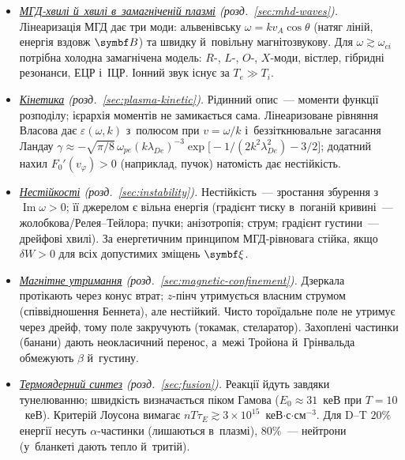 \documentclass[biblatex]{ConspectBook}
\begin{document}
\begin{itemize}
	  ізотропним тиском). Магнітне поле вморожене в~плазму за $R_m\gg1$, але самої вмороженості для утримання недостатньо.
	  Параметр $\beta=8\pi p/B^2$ показує, наскільки плазма деформує поле. Діамагнітний струм однаковий у~частинковому,
	  рідинному описах і~через намагніченість $M=-p/B$.
	\item \emph{\hyperref[sec:mhd-waves]{МГД-хвилі й~хвилі в~замагніченій плазмі} (розд.~\ref{sec:mhd-waves}).} Лінеаризація МГД дає три моди: альвенівську
	  $\omega=kv_A\cos\theta$ (натяг ліній, енергія вздовж $\vect B$) та швидку й~повільну магнітозвукову. Для $\omega\gtrsim\omega_{ci}$
	  потрібна холодна замагнічена модель: $R$-, $L$-, $O$-, $X$-моди, вістлер, гібридні резонанси, ЕЦР і~ІЦР. Іонний звук
	  існує за $T_e\gg T_i$.
	\item \emph{\hyperref[sec:plasma-kinetic]{Кінетика} (розд.~\ref{sec:plasma-kinetic}).} Рідинний опис~--- моменти функції розподілу; ієрархія моментів не замикається сама. Лінеаризоване
	  рівняння Власова дає $\varepsilon(\omega,k)$ з~полюсом при $v=\omega/k$ і~беззіткнювальне загасання Ландау
	  $\gamma\approx-\sqrt{\pi/8}\,\omega_{pe}(k\lambda_{De})^{-3}\exp\bigl[-1/(2k^2\lambda_{De}^2)-3/2\bigr]$; додатний нахил
	  $F_0'(v_\varphi)>0$ (наприклад, пучок) натомість дає нестійкість.
	\item \emph{\hyperref[sec:instability]{Нестійкості} (розд.~\ref{sec:instability}).} Нестійкість~--- зростання збурення з~$\operatorname{Im}\omega>0$; її джерелом є вільна енергія
	  (градієнт тиску в~поганій кривині~--- жолобкова/Релея--Тейлора; пучки; анізотропія; струм; градієнт густини~--- дрейфові хвилі).
	  За енергетичним принципом МГД-рівновага стійка, якщо $\delta W>0$ для всіх допустимих зміщень $\vect\xi$.
	\item \emph{\hyperref[sec:magnetic-confinement]{Магнітне утримання} (розд.~\ref{sec:magnetic-confinement}).} Дзеркала протікають через конус втрат; $z$-пінч утримується власним струмом
	  (співвідношення Беннета), але нестійкий. Чисто тороїдальне поле не утримує через дрейф, тому поле закручують (токамак, стеларатор).
	  Захоплені частинки (банани) дають неокласичний перенос, а~межі Тройона й~Грінвальда обмежують $\beta$ й~густину.
	\item \emph{\hyperref[sec:fusion]{Термоядерний синтез} (розд.~\ref{sec:fusion}).} Реакції йдуть завдяки тунелюванню; швидкість визначається піком Гамова
	  ($E_0\approx31$~кеВ при $T=10$~кеВ). Критерій Лоусона вимагає $nT\tau_E\gtrsim3\times10^{15}$~кеВ$\cdot$с$\cdot$см$^{-3}$.
	  Для D--T $20\%$ енергії несуть $\alpha$-частинки (лишаються в~плазмі), $80\%$~--- нейтрони (у~бланкеті дають тепло й~тритій).

\end{itemize}
\end{document}
